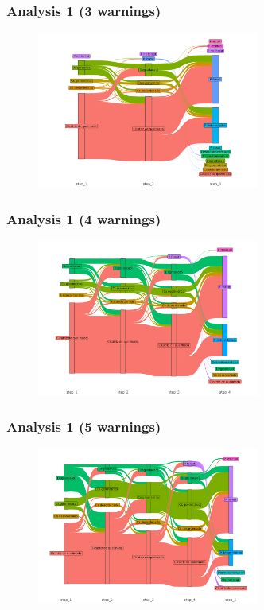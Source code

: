 \documentclass[aspectratio=169]{beamer}
\begin{document}
\begin{frame}
    \frametitle{Analysis 1 (3 warnings) }
    \begin{figure}[h] 
    \includegraphics[width=0.65\textwidth]{./figures/an1_plot_deter_prodes_subarea_trajectory_3.png}
    \end{figure}
\end{frame}

\begin{frame}
    \frametitle{Analysis 1 (4 warnings) }
    \begin{figure}[h] 
    \includegraphics[width=0.65\textwidth]{./figures/an1_plot_deter_prodes_subarea_trajectory_4.png}
    \end{figure}
\end{frame}

\begin{frame}
    \frametitle{Analysis 1 (5 warnings) }
    \begin{figure}[h] 
    \includegraphics[width=0.65\textwidth]{./figures/an1_plot_deter_prodes_subarea_trajectory_5.png}
    \end{figure}
\end{frame}
\end{document}
